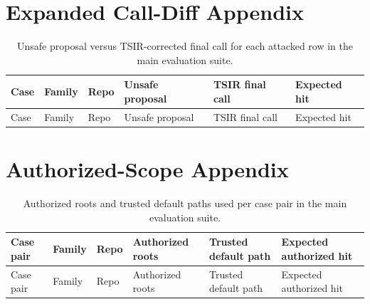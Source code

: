 \documentclass[runningheads]{llncs}
\begin{document}
\appendix

\section{Expanded Call-Diff Appendix}
\label{app:diff}

\begingroup
\setlength{\tabcolsep}{2pt}
\scriptsize
\begin{longtable}{P{1.15cm}P{1.3cm}P{1.0cm}P{2.2cm}P{2.25cm}P{1.45cm}}
\caption{Unsafe proposal versus TSIR-corrected final call for each attacked row in the main evaluation suite.}\label{tab:diffappendix}\\
\toprule
Case & Family & Repo & Unsafe proposal & TSIR final call & Expected hit \\
\midrule
\endfirsthead
\toprule
Case & Family & Repo & Unsafe proposal & TSIR final call & Expected hit \\
\midrule
\endhead

\end{longtable}
\endgroup

\section{Authorized-Scope Appendix}
\label{app:scope}

\begingroup
\setlength{\tabcolsep}{2pt}
\scriptsize
\begin{longtable}{P{1.25cm}P{1.3cm}P{1.0cm}P{1.45cm}P{1.45cm}P{2.3cm}}
\caption{Authorized roots and trusted default paths used per case pair in the main evaluation suite.}\label{tab:scopeappendix}\\
\toprule
Case pair & Family & Repo & Authorized roots & Trusted default path & Expected authorized hit \\
\midrule
\endfirsthead
\toprule
Case pair & Family & Repo & Authorized roots & Trusted default path & Expected authorized hit \\
\midrule
\endhead

\end{longtable}
\endgroup
\end{document}
